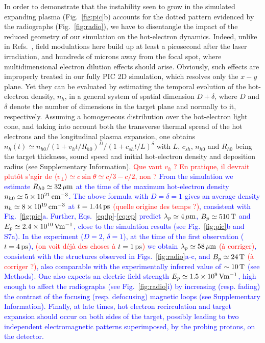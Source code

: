 \documentclass[aps,twocolumn,showpacs,superscriptaddress]{revtex4}
\begin{document}
In order to demonstrate that the instability seen to grow in the simulated expanding plasma (Fig.~\ref{fig:pic}b) accounts for the dotted pattern evidenced by the radiographs (Fig.~\ref{fig:radio}), we have to disentangle the impact of the reduced geometry of our simulation on the hot-electron dynamics. Indeed, unlike in Refs.~\cite{PRL_Gode_2017, NJP_Scott_2017}, field modulations here build up at least a picosecond after the laser irradiation, and hundreds of microns away from the focal spot, where multidimensional electron dilution effects should arise. Obviously, such effects are improperly treated in our fully PIC 2D simulation, which resolves only the $x-y$ plane. Yet they can be evaluated by estimating the temporal evolution of the hot-electron density, $n_h$, in a general system of spatial dimension $D+\delta$, where $D$ and $\delta$ denote the number of dimensions in the target plane and normally to it, respectively. Assuming a homogeneous distribution over the hot-electron light cone, and taking into account both the transverse thermal spread of the hot electrons and the longitudinal plasma expansion, one obtains $n_h(t) \simeq n_{h0}/(1+ v_h t /R_{h0})^D/(1+c_{sh} t/L)^\delta$ with $L$, $c_{sh}$, $n_{h0}$ and $R_{h0}$ being the target thickness, sound speed and initial hot-electron density and  deposition radius (see Supplementary Information).
\textcolor{red}{Que vaut $v_h$ ? En pratique, il devrait plut\^ot s'agir de $\langle v_\perp \rangle \simeq c\sin \theta \simeq c/3-c/2$, non ?}
\textcolor{blue}{From the simulation we estimate $R_{h0} \simeq 32\,\rm \mu m$ at the time of the maximum hot-electron density $n_{h0} \simeq 5\times 10^{21}\,\rm cm^{-3}$. The above formula with $D=\delta=1$ gives an average density $n_h \simeq 8 \times 10^{19}\,\rm cm^{-3}$ at $t = 1.44\,\rm ps$ \textcolor{red}{(quelle origine des temps ?)}, consistent with Fig.~\ref{fig:pic}a. Further, Eqs.~\eqref{eq:lp}-\eqref{eq:ep} predict $\lambda_p \simeq 4 \,\rm \mu m$, $B_p \simeq 510\,\rm T$ and $E_p \simeq 2.4\times10^{10}\,\rm Vm^{-1}$, close to the simulation results (see Fig.~\ref{fig:pic}b and S7a). In the experiment ($D=2$, $\delta=1$), at the time of the first observation ($t=4\,\rm ps$),
\textcolor{red}{(on voit d\'ej\`a des choses \`a $t=1\,\rm ps$)} we obtain
$\lambda_p \simeq 58 \,\rm \mu m$ \textcolor{red}{(\`a corriger)}, consistent with the structures observed in Figs.~\ref{fig:radio}a-c, and $B_p\simeq 24\,\rm T$ \textcolor{red}{(\`a corriger ?)}, also comparable with the experimentally inferred value of $\sim 10\,\rm T$ (see Methods). One also expects an electric field strength $E_p \simeq 1.5\times 10^9\,\rm V m^{-1}$, high enough to affect the radiographs (see Fig.~\ref{fig:radio}i) by increasing (resp. fading) the contrast of the focusing (resp. defocusing) magnetic loops (see Supplementary Information). Finally, at late times, hot electron recirculation and target expansion should occur on both sides of the target, possibly leading to two independent electromagnetic patterns superimposed, by the probing protons, on the detector.}
\end{document}
